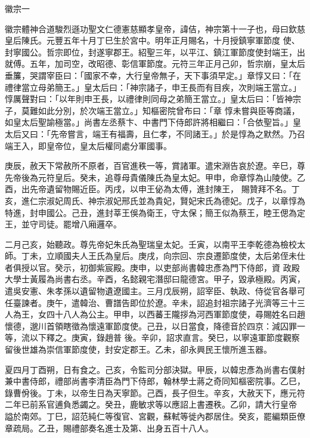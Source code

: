 
\begin{pinyinscope}

 徽宗一



 徽宗體神合道駿烈遜功聖文仁德憲慈顯孝皇帝，諱佶，神宗第十一子也，母曰欽慈皇后陳氏。元豐五年十月丁巳生於宮中。明年正月賜名，十月授鎮寧軍節度
 使、封寧國公。哲宗即位，封遂寧郡王。紹聖三年，以平江、鎮江軍節度使封端王，出就傅。五年，加司空，改昭德、彰信軍節度。元符三年正月己卯，哲宗崩，皇太后垂簾，哭謂宰臣曰：「國家不幸，大行皇帝無子，天下事須早定。」章惇又曰：「在禮律當立母弟簡王。」皇太后曰：「神宗諸子，申王長而有目疾，次則端王當立。」惇厲聲對曰：「以年則申王長，以禮律則同母之弟簡王當立。」皇太后曰：「皆神宗子，莫難如此分別，於次端王當立。」知樞密院曾布曰：「章
 惇未嘗與臣等商議，如皇太后聖諭極當。」尚書左丞蔡卞、中書門下侍郎許將相繼曰：「合依聖旨。」皇太后又曰：「先帝嘗言，端王有福壽，且仁孝，不同諸王。」於是惇為之默然。乃召端王入，即皇帝位，皇太后權同處分軍國事。



 庚辰，赦天下常赦所不原者，百官進秩一等，賞諸軍。遣宋淵告哀於遼。辛巳，尊先帝後為元符皇后。癸未，追尊母貴儀陳氏為皇太妃。甲申，命章惇為山陵使。乙酉，出先帝遺留物賜近臣。丙戌，以申王佖為太傅，進封陳王，
 賜贊拜不名。丁亥，進仁宗淑妃周氏、神宗淑妃邢氏並為貴妃，賢妃宋氏為德妃。戊子，以章惇為特進，封申國公。己丑，進封莘王俁為衛王，守太保；簡王似為蔡王，睦王偲為定王，並守司徒。罷增八廂邏卒。



 二月己亥，始聽政。尊先帝妃朱氏為聖瑞皇太妃。壬寅，以南平王李乾德為檢校太師。丁未，立順國夫人王氏為皇后。庚戌，向宗回、宗良遷節度使，太后弟侄未仕者俱授以官。癸示，初御紫宸殿。庚申，以吏部尚書韓忠彥為門下侍郎，資
 政殿大學士黃履為尚書右丞。辛酉，名懿親宅潛邸曰龍德宮。甲子，毀承極殿。丙寅，遣吳安憲、朱孝孫以遺留物遺遼國主。三月戊辰朔，詔宰臣、執政、侍從官各舉可任臺諫者。庚午，遣韓治、曹譜告即位於遼。辛未，詔追封祖宗諸子光濟等三十三人為王，女四十八人為公主。甲申，以西蕃王隴拶為河西軍節度使，尋賜姓名曰趙懷德，邈川首領瞎徵為懷遠軍節度使。己丑，以日當食，降德音於四京：減囚罪一等，流以下釋之。庚寅，錄趙普
 後。辛卯，詔求直言。癸巳，以寧遠軍節度觀察留後世雄為崇信軍節度使，封安定郡王。乙未，卻永興民王懷所進玉器。



 夏四月丁酉朔，日有食之。己亥，令監司分部決獄。甲辰，以韓忠彥為尚書右僕射兼中書侍郎，禮部尚書李清臣為門下侍郎，翰林學士蔣之奇同知樞密院事。乙巳，錄曹佾後。丁未，以帝生日為天寧節。己酉，長子但生。辛亥，大赦天下，應元符二年已前系官逋負悉蠲之。癸丑，鹿敏求等以應詔上書遷秩。乙卯，請大行皇帝
 謚於南郊。丁巳，詔范純仁等復官、宮觀，蘇軾等徙內郡居住。癸亥，罷編類臣僚章疏局。乙丑，賜禮部奏名進士及第、出身五百十八人。




\end{pinyinscope}
